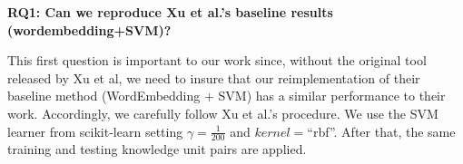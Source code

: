 \documentclass[sigconf,review, anonymous]{acmart}
\theoremstyle{break}
\begin{document}

\textbf{RQ1: Can we reproduce Xu et al.'s baseline results (wordembedding+SVM)?}


This first question   is    important to our work since, without the original tool released by Xu et al,
we need to insure that  our reimplementation of their baseline method (WordEmbedding + SVM) has a similar performance to their work.
Accordingly, we carefully follow Xu et al.'s procedure\cite{xu2016predicting}. We 
use the SVM learner from scikit-learn setting $\gamma = \frac{1}{200}$ and $kernel= $``rbf''. After that, the same training and testing knowledge unit pairs are applied.
\end{document}

